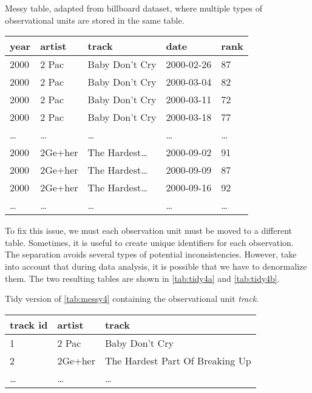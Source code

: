 \begin{tablebox}[label=tab:messy4]{Messy table, adapted from billboard dataset, where multiple types of observational units are stored in the same table.}
  \centering
  \begin{tabular}{lllll}
    \toprule
    year & artist & track & date & rank \\
    \midrule
    2000 & 2 Pac & Baby Don't Cry & 2000-02-26 & 87 \\
    2000 & 2 Pac & Baby Don't Cry & 2000-03-04 & 82 \\
    2000 & 2 Pac & Baby Don't Cry & 2000-03-11 & 72 \\
    2000 & 2 Pac & Baby Don't Cry & 2000-03-18 & 77 \\
    \dots & \dots & \dots & \dots & \dots \\
    2000 & 2Ge+her & The Hardest\dots & 2000-09-02 & 91 \\
    2000 & 2Ge+her & The Hardest\dots & 2000-09-09 & 87 \\
    2000 & 2Ge+her & The Hardest\dots & 2000-09-16 & 92 \\
    \dots & \dots & \dots & \dots & \dots \\
    \bottomrule
  \end{tabular}
\end{tablebox}

To fix this issue, we must each observation unit must be moved to a different table.
Sometimes, it is useful to create unique identifiers for each observation.
The separation avoids several types of potential inconsistencies.  However, take into
account that during data analysis, it is possible that we have to denormalize them.  The
two resulting tables are shown in \cref{tab:tidy4a} and \cref{tab:tidy4b}.

\begin{tablebox}[label=tab:tidy4a]{Tidy version of \cref{tab:messy4} containing the observational unit \emph{track}.}
  \centering
  \begin{tabular}{lll}
    \toprule
    track id & artist & track \\
    \midrule
    1 & 2 Pac & Baby Don't Cry \\
    2 & 2Ge+her & The Hardest Part Of Breaking Up \\
    \dots & \dots & \dots \\
    \bottomrule
  \end{tabular}
\end{tablebox}


